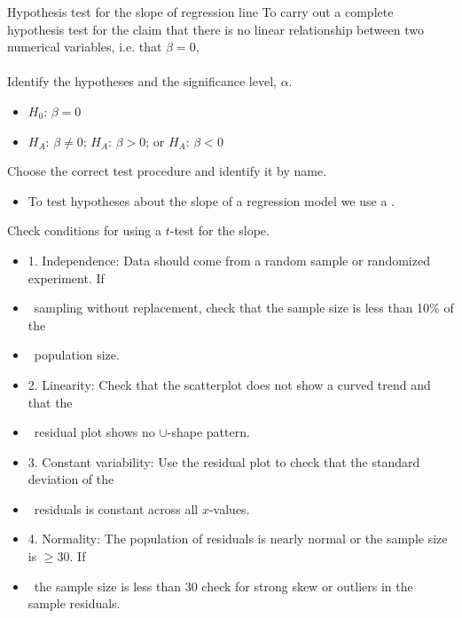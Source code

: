 
\begin{onebox}{Hypothesis test for the slope of regression line}
To carry out a complete hypothesis test for the claim that there is no linear relationship between two numerical variables, i.e. that $\beta=0$, 
\\
\\
 Identify the hypotheses and the significance level, $\alpha$.\vspace{-1mm}
\begin{itemize}
\setlength{\itemsep}{0mm}
\item[] $H_0$: $\beta = 0$  
\item[]  $H_A$: $\beta \ne 0$;  \quad $H_A$: $\beta > 0$; \quad or \quad $H_A$: $\beta < 0$ 
\end{itemize} 
 Choose the correct test procedure and identify it by name. \vspace{-1mm}
\begin{itemize}
\item[] To test hypotheses about the slope of a regression model we use a . 
\end{itemize}
  Check conditions for using a $t$-test for the slope.\vspace{-1mm}
\begin{itemize}
\setlength{\itemsep}{0mm}
\item[]  1. Independence:  Data should come from a random sample or randomized experiment.  If 
\item[] \ \quad sampling without replacement, check that the sample size is less than 10\% of the 
\item[] \ \quad population size.
\item[] 2.  Linearity:  Check that the scatterplot does not show a curved trend and that the 
\item[] \ \quad residual plot shows no $\cup$-shape pattern.  
\item[] 3.  Constant variability:  Use the residual plot to check that the standard deviation of the 
\item[] \ \quad residuals is constant across all $x$-values.
\item[] 4. Normality:  The population of residuals is nearly normal or the sample size is $\ge 30$.  If 
\item[] \ \quad the sample size is less than 30 check for strong skew or outliers in the sample residuals.  

\end{itemize}
\end{onebox}
